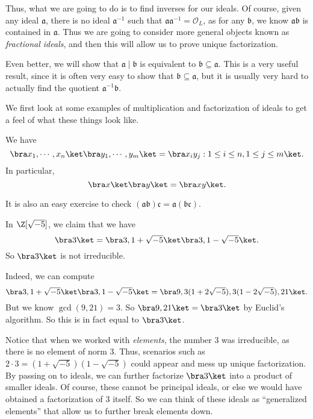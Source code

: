 \documentclass[a4paper]{article}
\begin{document}
Thus, what we are going to do is to find inverses for our ideals. Of course, given any ideal $\mathfrak{a}$, there is no ideal $\mathfrak{a}^{-1}$ such that $\mathfrak{a}\mathfrak{a}^{-1} = \mathcal{O}_L$, as for any $\mathfrak{b}$, we know $\mathfrak{a}\mathfrak{b}$ is contained in $\mathfrak{a}$. Thus we are going to consider more general objects known as \emph{fractional ideals}, and then this will allow us to prove unique factorization.

Even better, we will show that $\mathfrak{a} \mid \mathfrak{b}$ is equivalent to $\mathfrak{b} \subseteq \mathfrak{a}$. This is a very useful result, since it is often very easy to show that $\mathfrak{b} \subseteq \mathfrak{a}$, but it is usually very hard to actually find the quotient $\mathfrak{a}^{-1}\mathfrak{b}$.


We first look at some examples of multiplication and factorization of ideals to get a feel of what these things look like.
\begin{eg}
  We have
  \[
    \bra x_1, \cdots, x_n\ket \bra y_1, \cdots, y_m\ket = \bra x_i y_j: 1 \leq i \leq n, 1 \leq j \leq m\ket.
  \]
  In particular,
  \[
    \bra x\ket \bra y\ket = \bra xy\ket.
  \]
\end{eg}
It is also an easy exercise to check $(\mathfrak{a}\mathfrak{b})\mathfrak{c} = \mathfrak{a}(\mathfrak{b}\mathfrak{c})$.

\begin{eg}
  In $\Z[\sqrt{-5}]$, we claim that we have
  \[
    \bra 3\ket = \bra 3, 1 + \sqrt{-5}\ket \bra 3, 1 - \sqrt{-5}\ket.
  \]
  So $\bra 3\ket$ is not irreducible.

  Indeed, we can compute
  \[
    \bra 3, 1 + \sqrt{-5}\ket \bra 3, 1 - \sqrt{-5}\ket = \bra 9, 3(1 + 2\sqrt{-5}), 3(1 - 2\sqrt{-5}), 21\ket.
  \]
  But we know $\gcd(9, 21) = 3$. So $\bra 9, 21\ket = \bra 3\ket$ by Euclid's algorithm. So this is in fact equal to $\bra 3\ket$.
\end{eg}
Notice that when we worked with \emph{elements}, the number $3$ was irreducible, as there is no element of norm $3$. Thus, scenarios such as $2 \cdot 3 = (1 + \sqrt{-5})(1 - \sqrt{-5})$ could appear and mess up unique factorization. By passing on to ideals, we can further factorize $\bra3\ket$ into a product of smaller ideals. Of course, these cannot be principal ideals, or else we would have obtained a factorization of $3$ itself. So we can think of these ideals as ``generalized elements'' that allow us to further break elements down.
\end{document}
